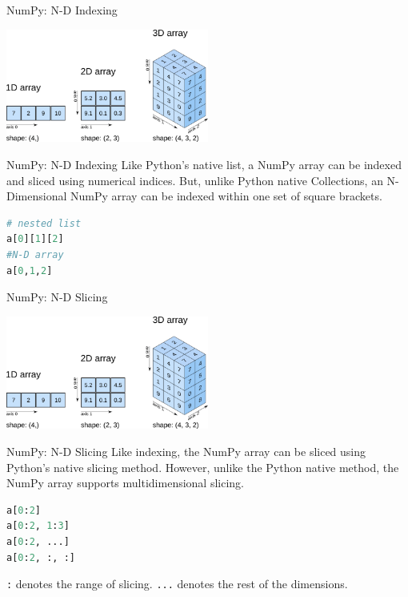 \documentclass{beamer}
\begin{document}
    \begin{frame}[fragile]{NumPy: N-D Indexing}
        \begin{center}
            \includegraphics[width=0.5\textwidth]{figures/what-is-numpy-768x429.png}
        \end{center}
    \end{frame}
    \begin{frame}[fragile]{NumPy: N-D Indexing}
        Like Python's native list, a NumPy array can be indexed and sliced using numerical indices. But, unlike Python native Collections, an N-Dimensional NumPy array can be indexed within one set of square brackets.
        \begin{example}
            \begin{lstlisting}[language=Python]
# nested list
a[0][1][2]
#N-D array
a[0,1,2]
            \end{lstlisting}
        \end{example}
    \end{frame}

    \begin{frame}[fragile]{NumPy: N-D Slicing}
        \begin{center}
            \includegraphics[width=0.5\textwidth]{figures/what-is-numpy-768x429.png}
        \end{center}
    \end{frame}
    \begin{frame}[fragile]{NumPy: N-D Slicing}
        Like indexing, the NumPy array can be sliced using Python's native slicing method. However, unlike the Python native method, the NumPy array supports multidimensional slicing.
        \begin{example}
            \begin{lstlisting}[language=Python]
a[0:2]
a[0:2, 1:3]
a[0:2, ...]
a[0:2, :, :]
            \end{lstlisting}
        \end{example}
        \lstinline[language=Python]{:} denotes the range of slicing. \lstinline[language=Python]{...} denotes the rest of the dimensions.
    \end{frame}
\end{document}
